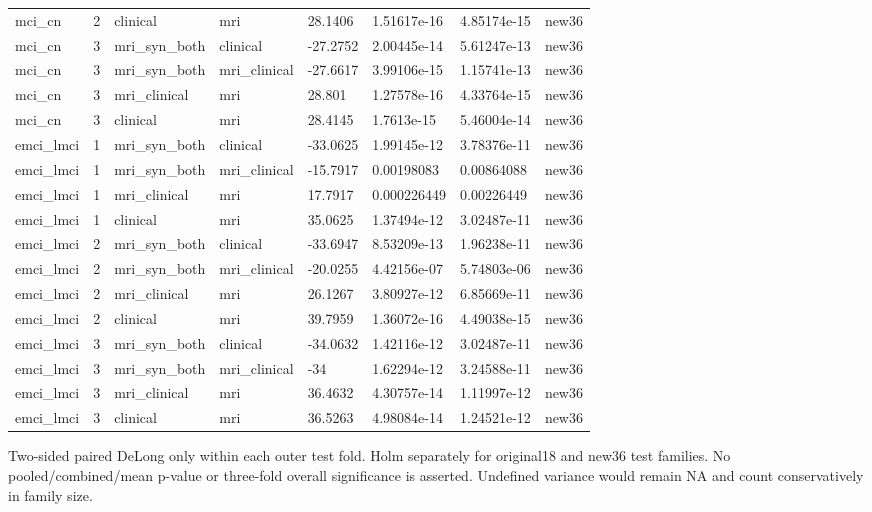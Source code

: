 \begin{landscape}
\begin{longtable}{llllllll}
mci\_cn & 2 & clinical & mri & 28.1406 & 1.51617e-16 & 4.85174e-15 & new36 \\
mci\_cn & 3 & mri\_syn\_both & clinical & -27.2752 & 2.00445e-14 & 5.61247e-13 & new36 \\
mci\_cn & 3 & mri\_syn\_both & mri\_clinical & -27.6617 & 3.99106e-15 & 1.15741e-13 & new36 \\
mci\_cn & 3 & mri\_clinical & mri & 28.801 & 1.27578e-16 & 4.33764e-15 & new36 \\
mci\_cn & 3 & clinical & mri & 28.4145 & 1.7613e-15 & 5.46004e-14 & new36 \\
emci\_lmci & 1 & mri\_syn\_both & clinical & -33.0625 & 1.99145e-12 & 3.78376e-11 & new36 \\
emci\_lmci & 1 & mri\_syn\_both & mri\_clinical & -15.7917 & 0.00198083 & 0.00864088 & new36 \\
emci\_lmci & 1 & mri\_clinical & mri & 17.7917 & 0.000226449 & 0.00226449 & new36 \\
emci\_lmci & 1 & clinical & mri & 35.0625 & 1.37494e-12 & 3.02487e-11 & new36 \\
emci\_lmci & 2 & mri\_syn\_both & clinical & -33.6947 & 8.53209e-13 & 1.96238e-11 & new36 \\
emci\_lmci & 2 & mri\_syn\_both & mri\_clinical & -20.0255 & 4.42156e-07 & 5.74803e-06 & new36 \\
emci\_lmci & 2 & mri\_clinical & mri & 26.1267 & 3.80927e-12 & 6.85669e-11 & new36 \\
emci\_lmci & 2 & clinical & mri & 39.7959 & 1.36072e-16 & 4.49038e-15 & new36 \\
emci\_lmci & 3 & mri\_syn\_both & clinical & -34.0632 & 1.42116e-12 & 3.02487e-11 & new36 \\
emci\_lmci & 3 & mri\_syn\_both & mri\_clinical & -34 & 1.62294e-12 & 3.24588e-11 & new36 \\
emci\_lmci & 3 & mri\_clinical & mri & 36.4632 & 4.30757e-14 & 1.11997e-12 & new36 \\
emci\_lmci & 3 & clinical & mri & 36.5263 & 4.98084e-14 & 1.24521e-12 & new36 \\
\end{longtable}
\noindent\parbox{\linewidth}{\footnotesize Two-sided paired DeLong only within each outer test fold. Holm separately for original18 and new36 test families. No pooled/combined/mean p-value or three-fold overall significance is asserted. Undefined variance would remain NA and count conservatively in family size.}
\endgroup
\end{landscape}
